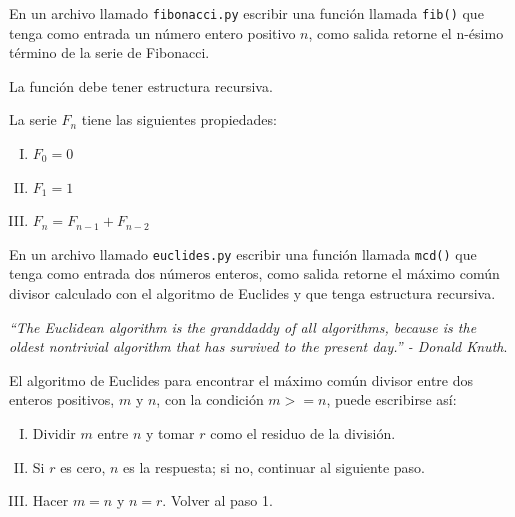 \documentclass[11pt,letterpaper]{exam}
\begin{document}
\begin{questions}

 En un archivo llamado \verb"fibonacci.py" 
escribir una función llamada \verb"fib()" que tenga como entrada un número entero 
positivo $n$, como salida retorne el n-\'esimo t\'ermino de la serie de Fibonacci.

La función debe tener estructura recursiva.

\medskip
La serie $F_n$ tiene las siguientes propiedades:
\begin{enumerate}[I.)]
	\item $F_0 = 0$
	\item $F_1 = 1$
	\item $F_n = F_{n-1} +F_{n-2}$
\end{enumerate}

En un archivo llamado \verb"euclides.py"  escribir una función llamada \verb"mcd()"
que tenga como entrada dos números enteros, como salida retorne el máximo común divisor
calculado con el algoritmo de Euclides y que tenga estructura recursiva.

\medskip
\textit{``The Euclidean algorithm is the granddaddy of all algorithms, because is
the oldest nontrivial algorithm that has survived to the present day.'' - Donald
Knuth}.
\medskip

El algoritmo de Euclides para encontrar el máximo común divisor entre dos 
enteros positivos, $m$ y $n$, con la condición $m>=n$, puede escribirse así:

\begin{enumerate}[I.)]
	\item Dividir $m$ entre $n$ y tomar $r$ como el residuo de la división.

	\item Si $r$ es cero, $n$ es la respuesta; si no, continuar al siguiente paso.

	\item Hacer $m=n$ y $n=r$. Volver al paso 1.
\end{enumerate}

\end{questions}
\end{document}
